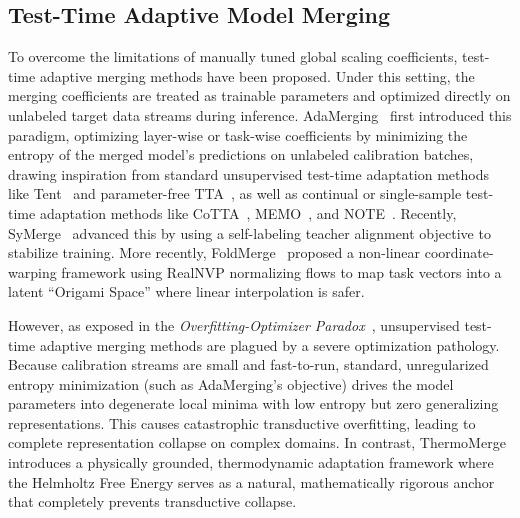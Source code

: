 \subsection{Test-Time Adaptive Model Merging}
To overcome the limitations of manually tuned global scaling coefficients, test-time adaptive merging methods have been proposed. Under this setting, the merging coefficients are treated as trainable parameters and optimized directly on unlabeled target data streams during inference. AdaMerging~\cite{yang2024adamerging} first introduced this paradigm, optimizing layer-wise or task-wise coefficients by minimizing the entropy of the merged model's predictions on unlabeled calibration batches, drawing inspiration from standard unsupervised test-time adaptation methods like Tent~\cite{wang2020tent} and parameter-free TTA~\cite{boudiaf2022parameter}, as well as continual or single-sample test-time adaptation methods like CoTTA~\cite{wang2022continual}, MEMO~\cite{zhang2022memo}, and NOTE~\cite{gong2022note}. Recently, SyMerge~\cite{jung2025symerge} advanced this by using a self-labeling teacher alignment objective to stabilize training. More recently, FoldMerge~\cite{foldmerge_origami} proposed a non-linear coordinate-warping framework using RealNVP normalizing flows to map task vectors into a latent ``Origami Space'' where linear interpolation is safer.

However, as exposed in the \emph{Overfitting-Optimizer Paradox}~\cite{overfittingoptimizerparadox}, unsupervised test-time adaptive merging methods are plagued by a severe optimization pathology. Because calibration streams are small and fast-to-run, standard, unregularized entropy minimization (such as AdaMerging's objective) drives the model parameters into degenerate local minima with low entropy but zero generalizing representations. This causes catastrophic transductive overfitting, leading to complete representation collapse on complex domains. In contrast, ThermoMerge introduces a physically grounded, thermodynamic adaptation framework where the Helmholtz Free Energy serves as a natural, mathematically rigorous anchor that completely prevents transductive collapse.

